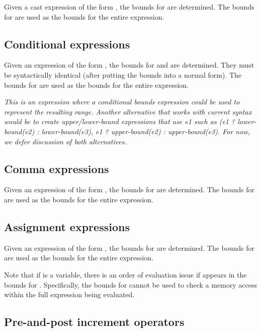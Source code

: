 Given a cast expression of the form ,
the bounds for  are determined. The bounds for
 are used as the bounds for the entire expression.
  
\subsection{Conditional expressions}

Given an expression of the form   
\code{:} , the bounds for  and  are
determined. They must be syntactically identical (after putting the
bounds into a normal form). The bounds for  are used as the
bounds for the entire expression.

\emph{This is an expression where a conditional bounds expression could
be used to represent the resulting range.  Another alternative that works
with current syntax would be to create upper/lower-bound expressions
that use e1 such as (e1 ? lower-bound(e2) : lower-bound(e3), e1 ?
upper-bound(e2) : upper-bound(e3). For now, we defer discussion of both
alternatives. }

\subsection{Comma expressions}

Given an expression of the form  \code{,} , the
bounds for  are determined. The bounds for  are used
as the bounds for the entire expression.  

\subsection{Assignment expressions}

Given an expression of the form  \code{ = } , the
bounds for  are determined. The bounds for  are used
as the bounds for the entire expression.

Note that if  is a variable,
there is an order of evaluation issue if  appears in the bounds for
.   Specifically, the bounds for  cannot be used to
check a memory access within the full expression being evaluated.

\subsection{Pre-and-post increment operators}
\label{section:inferring-increment-bounds}

